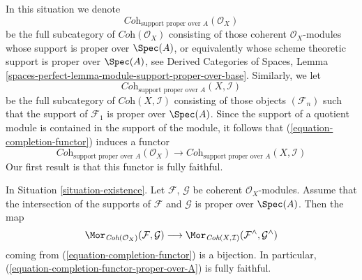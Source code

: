 \noindent
In this situation we denote
$$
\textit{Coh}_{\text{support proper over } A}(\mathcal{O}_X)
$$
be the full subcategory of $\textit{Coh}(\mathcal{O}_X)$
consisting of those coherent $\mathcal{O}_X$-modules whose
support is proper over $\Spec(A)$, or equivalently whose
scheme theoretic support is proper over $\Spec(A)$, see
Derived Categories of Spaces, Lemma
\ref{spaces-perfect-lemma-module-support-proper-over-base}.
Similarly, we let
$$
\textit{Coh}_{\text{support proper over } A}(X, \mathcal{I})
$$
be the full subcategory of $\textit{Coh}(X, \mathcal{I})$
consisting of those objects $(\mathcal{F}_n)$ such that
the support of $\mathcal{F}_1$ is proper over $\Spec(A)$.
Since the support of a quotient module is contained in the support
of the module, it follows that (\ref{equation-completion-functor})
induces a functor
\begin{equation}
\label{equation-completion-functor-proper-over-A}
\textit{Coh}_{\text{support proper over }A}(\mathcal{O}_X)
\longrightarrow
\textit{Coh}_{\text{support proper over }A}(X, \mathcal{I})
\end{equation}
Our first result is that this functor is fully faithful.

\begin{lemma}
\label{lemma-fully-faithful}
In Situation \ref{situation-existence}.
Let $\mathcal{F}$, $\mathcal{G}$ be coherent $\mathcal{O}_X$-modules.
Assume that the intersection of the supports of
$\mathcal{F}$ and $\mathcal{G}$ is proper over $\Spec(A)$. Then the map
$$
\Mor_{\textit{Coh}(\mathcal{O}_X)}(\mathcal{F}, \mathcal{G})
\longrightarrow
\Mor_{\textit{Coh}(X, \mathcal{I})}
(\mathcal{F}^\wedge, \mathcal{G}^\wedge)
$$
coming from (\ref{equation-completion-functor}) is a bijection.
In particular, (\ref{equation-completion-functor-proper-over-A})
is fully faithful.
\end{lemma}

